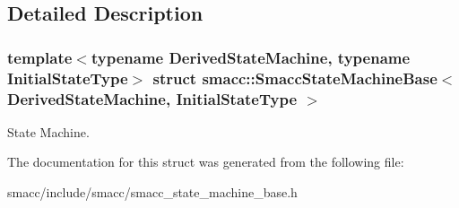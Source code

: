 \subsection{Detailed Description}
\subsubsection*{template$<$typename Derived\+State\+Machine, typename Initial\+State\+Type$>$\newline
struct smacc\+::\+Smacc\+State\+Machine\+Base$<$ Derived\+State\+Machine, Initial\+State\+Type $>$}

State Machine. 

The documentation for this struct was generated from the following file\+:\begin{DoxyCompactItemize}
\item 
smacc/include/smacc/smacc\+\_\+state\+\_\+machine\+\_\+base.\+h\end{DoxyCompactItemize}
